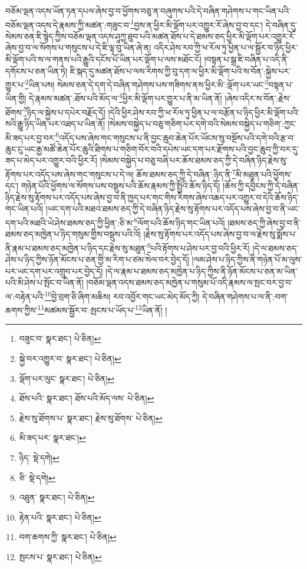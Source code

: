 བཅོམ་ལྡན་འདས་ཡོན་ཏན་དཔལ་ཞེས་བྱ་བ་ཕྱོགས་བཅུ་ན་བཞུགས་པའི་དེ་བཞིན་གཤེགས་པ་གང་ཡིན་པའི་བཅོམ་ལྡན་འདས་དེ་རྣམས་ཀྱི་མཚན་:གཟུང་བ་\footnote{བཟུང་བ་  སྣར་ཐང་།  པེ་ཅིན། }བྱས་ན་ཕྱིར་མི་ལྡོག་པར་འགྱུར་རོ་ཞེས་བྱ་བ་དང་། དེ་བཞིན་དུ་སེམས་ཅན་ཇི་སྙེད་ཀྱིས་བཅོམ་ལྡན་འདས་ཤཱཀྱ་ཐུབ་པའི་མཚན་ཐོས་པ་དེ་ཐམས་ཅད་ཕྱིར་མི་ལྡོག་པར་འགྱུར་རོ་ཞེས་བྱ་བ་ལ་སོགས་པ་གསུངས་པ་དེ་ཇི་ལྟ་བུ་ཡིན་ཞེ་ན། འདིར་ཤེས་རབ་ཀྱི་ཕ་རོལ་ཏུ་ཕྱིན་པ་ལ་སྦྱོར་བ་ཉིད་ཕྱིར་མི་ལྡོག་པའི་ས་ལ་གནས་པའི་རྒྱུའི་དངོས་པོ་ཡིན་པར་ལྡོག་པ་ལས་མཐོང་ངོ། །བསྟན་པ་སྒྲ་ཇི་བཞིན་པ་འདི་ནི་དགོངས་པ་ཅན་ཡིན་ཏེ། ཇི་སྐད་དུ་མཚན་ཐོས་པ་ལས་རིགས་ཀྱི་བུ་དག་ལ་ཕྱིར་མི་ལྡོག་པའི་ས་བོན་:སྐྱེས་པར་གྱུར་པ་\footnote{སྐྱེ་བར་འགྱུར་བ་  སྣར་ཐང་།  པེ་ཅིན། }ཡིན་པས། སེམས་ཅན་དེ་དག་དེ་བཞིན་གཤེགས་པས་གཟིགས་ནས་ཕྱིར་མི་:ལྡོག་པར་ཡང་\footnote{ལྡོག་པར་ལུང་  སྣར་ཐང་།  པེ་ཅིན། }བསྟན་པ་ཡིན་གྱི། དེ་རྣམས་མཚན་:ཐོས་པའི་མོད་ལ་\footnote{ཐོས་པའི་  སྣར་ཐང་། ཐོས་པའི་མོད་ལས་  པེ་ཅིན། }ཕྱིར་མི་ལྡོག་པར་གྱུར་པ་ནི་མ་ཡིན་ནོ། །ཞེས་འདིར་ས་བོན་:རྗེས་ཐོགས་\footnote{རྗེས་སུ་ཐོགས་པ་  སྣར་ཐང་། རྗེས་སུ་ཐོགས་  པེ་ཅིན། }ཉིད་ལ་སྐྱེས་པ་དཔེར་བརྗོད་དོ། །དེའི་ཕྱིར་ཤེས་རབ་ཀྱི་ཕ་རོལ་ཏུ་ཕྱིན་པ་ལ་བརྩོན་པ་ཉིད་ཕྱིར་མི་ལྡོག་པའི་སའི་རྒྱུ་ཉིད་ཡིན་པར་འཐད་པ་ཡིན་ནོ། །སེམས་བསྐྱེད་པ་བཅུ་གཅིག་པར་དགེ་བའི་སེམས་བསྐྱེད་པ་གཅིག་:ཀྱང་མི་ཟད་པར་བྱ་བར་\footnote{མི་ཟད་པར་  སྣར་ཐང་། }འདོད་པས་ཞེས་གང་གསུངས་པ་ནི་བྱང་ཆུབ་ཆེན་པོར་ཡོངས་སུ་བསྔོས་པའི་དགེ་བའི་རྩ་བ་ཆུང་ངུ་ཡང་རྒྱ་མཚོ་ཆེན་པོར་ཆུའི་ཐིགས་པ་གཅིག་བོར་བའི་དཔེས་ཡང་དག་པར་རྫོགས་པའི་བྱང་ཆུབ་ཀྱི་བར་དུ་ཟད་པ་མེད་པར་འགྱུར་བའི་ཕྱིར་རོ། །སེམས་བསྐྱེད་པ་བཅུ་བཞི་པར་ཆོས་ཐམས་ཅད་ཀྱི་དེ་བཞིན་ཉིད་རྗེས་སུ་རྟོགས་པར་འདོད་པས་ཞེས་གང་གསུངས་པ་དེ་ལ། ཆོས་ཐམས་ཅད་ཀྱི་དེ་བཞིན་:ཉིད་ནི་\footnote{ཉིད་  སྡེ་དགེ། }མི་མཐུན་པའི་ཕྱོགས་དང་། གཉེན་པོའི་ཕྱོགས་ལ་སོགས་པས་བསྡུས་པའི་ཆོས་རྣམས་ཀྱི་སྤྱིའི་ཆོས་ཉིད་དོ། །ཆོས་ཀྱི་དབྱིངས་ཀྱི་དེ་བཞིན་ཉིད་རྗེས་སུ་རྟོགས་པར་འདོད་པས་ཞེས་བྱ་བ་ནི་ཁྱད་པར་གང་གིས་རིགས་ཞེས་འཆད་པར་འགྱུར་བ་དེའི་ཆོས་ཉིད་གང་ཡིན་པའོ། །ཡང་དག་པའི་མཐའ་ཐམས་ཅད་ཀྱི་དེ་བཞིན་ཉིད་རྗེས་སུ་རྟོགས་པར་འདོད་པས་ཞེས་བྱ་བ་ནི་ཡང་དག་པའི་མཐའི་ཡེ་ཤེས་ཐམས་ཅད་ཀྱི་ཕྱིན་:ཅི་མ་\footnote{ཅི་  སྡེ་དགེ། }ལོག་པའི་ཆོས་ཉིད་གང་ཡིན་པའོ། །ཐམས་ཅད་ཀྱི་ཞེས་བྱ་བ་ནི་ཐམས་ཅད་མཁྱེན་པ་ཉིད་གསུམ་གྱིས་བསྡུས་པའི་འོ། །རྗེས་སུ་རྟོགས་པར་འདོད་པས་ཞེས་བྱ་བ་ལ་རྗེས་སུ་སྨོས་པ་ནི་རྣམ་པ་ཐམས་ཅད་མཁྱེན་པ་ཉིད་དང་རྗེས་སུ་མཐུན་\footnote{འཐུན་  སྣར་ཐང་།  པེ་ཅིན། }པའི་རྟོགས་པ་ཤེས་པར་བྱ་བའི་ཕྱིར་རོ། །དེ་ལ་ཐམས་ཅད་ཤེས་པ་ཉིད་ཀྱིས་ཉོན་མོངས་པ་ཅན་གྱི་མ་རིག་པ་ཙམ་སེལ་བར་བྱེད་དོ། །ལམ་ཤེས་པ་ཉིད་ཀྱིས་ནི་གཉེན་པོ་མ་ལུས་པར་ཡང་དག་པར་འགྲུབ་པར་བྱེད་དོ། །དེ་ལ་རྣམ་པ་ཐམས་ཅད་མཁྱེན་པ་ཉིད་ཀྱིས་ནི་ཉོན་མོངས་པ་ཅན་མ་ཡིན་པའི་མི་ཤེས་པ་སྤོང་བ་ཡིན་ནོ། །བཅོམ་ལྡན་འདས་ཐམས་ཅད་མཁྱེན་པ་གསུམ་པོ་འདི་རྣམས་ལ་སྤང་བར་བྱ་བ་ལ་:བརྟེན་པའི་\footnote{རྟེན་པའི་  སྣར་ཐང་།  པེ་ཅིན། }བྱེ་བྲག་ཅི་ཞིག་མཆིས། རབ་འབྱོར་གང་ཡང་མེད་མོད་ཀྱི། དེ་བཞིན་གཤེགས་པ་ལ་ནི་:བག་ཆགས་ཀྱིས་\footnote{བག་ཆགས་ཀྱི་  སྣར་ཐང་།  པེ་ཅིན། }མཚམས་སྦྱོར་བ་:སྤངས་པ་ཡོད་པ་\footnote{སྤངས་པ་  སྣར་ཐང་།  པེ་ཅིན། }ཡིན་ནོ། །
